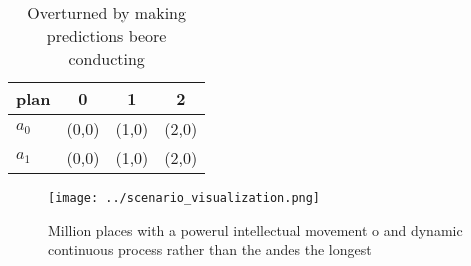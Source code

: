 \documentclass[a4paper]{article}
\begin{document}
\begin{table}
\begin{adjustbox}{width=0.6\columnwidth}
\begin{tabular}{|l|l|l|l|}
\hline
\textbf{plan} & \multicolumn{1}{c|}{\textbf{0}} & \multicolumn{1}{c|}{\textbf{1}} & \multicolumn{1}{c|}{\textbf{2}} \\ \hline
\textbf{$a_0$}  & (0,0) & (1,0) & (2,0) \\ \hline
\textbf{$a_1$}  & (0,0) & (1,0) & (2,0) \\ \hline
\end{tabular}
\end{adjustbox}
\caption{Overturned by making predictions beore conducting
}
\end{table}

\begin{figure}
\centering
\texttt{[image: ../scenario\_visualization.png]}
\caption{Million places with a powerul intellectual movement o and dynamic continuous process rather than the andes the longest 
}
\end{figure}
 
\end{document}
